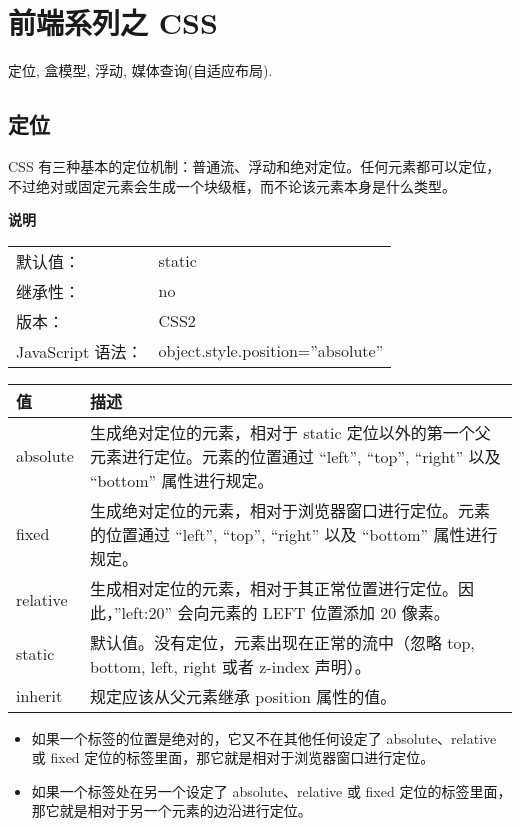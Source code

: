\section{前端系列之 CSS}\hypertarget{css}{}\label{css}

定位, 盒模型, 浮动, 媒体查询(自适应布局).

\subsection{定位}\hypertarget{section}{}\label{section}

CSS 有三种基本的定位机制：普通流、浮动和绝对定位。任何元素都可以定位，不过绝对或固定元素会生成一个块级框，而不论该元素本身是什么类型。

\textbf{说明}

\begin{longtable}{|l|l|}   %
\hline
默认值： & static\\
继承性： & no\\
版本： & CSS2\\
JavaScript 语法： & object.style.position=''absolute''\\
\hline
\end{longtable}   %

\begin{longtable}{|l|l|}   %
\hline
值 & 描述\\
\hline
absolute & 生成绝对定位的元素，相对于 static 定位以外的第一个父元素进行定位。元素的位置通过 ``left'', ``top'', ``right'' 以及 ``bottom'' 属性进行规定。\\
fixed & 生成绝对定位的元素，相对于浏览器窗口进行定位。元素的位置通过 ``left'', ``top'', ``right'' 以及 ``bottom'' 属性进行规定。\\
relative & 生成相对定位的元素，相对于其正常位置进行定位。因此，''left:20'' 会向元素的 LEFT 位置添加 20 像素。\\
static & 默认值。没有定位，元素出现在正常的流中（忽略 top, bottom, left, right 或者 z-index 声明）。\\
inherit & 规定应该从父元素继承 position 属性的值。\\
\hline
\end{longtable}   %

\begin{itemize}
\item 如果一个标签的位置是绝对的，它又不在其他任何设定了 absolute、relative 或 fixed 定位的标签里面，那它就是相对于浏览器窗口进行定位。
\item 如果一个标签处在另一个设定了 absolute、relative 或 fixed 定位的标签里面，那它就是相对于另一个元素的边沿进行定位。
\end{itemize}


